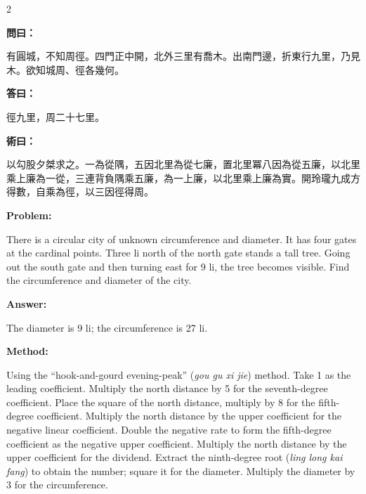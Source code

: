 \documentclass[11pt,a4paper]{article}
\newcommand{\wen}{\textbf{\color{sectioncolor}問}}
\newcommand{\da}{\textbf{\color{answercolor}答}}
\newcommand{\shu}{\textbf{\color{methodcolor}術}}
\newcommand{\prob}{\textbf{\color{sectioncolor}Problem}}
\newcommand{\ans}{\textbf{\color{answercolor}Answer}}
\newcommand{\meth}{\textbf{\color{methodcolor}Method}}
\newenvironment{zhanswer}{%
  \medskip\noindent{\color{answercolor}\rule{0.9\columnwidth}{0.4pt}}%
  \par\color{answercolor}\small
}{\par\medskip}
\newenvironment{enanswer}{%
  \medskip\noindent{\color{answercolor}\rule{0.9\columnwidth}{0.4pt}}%
  \par\color{answercolor}\small
}{\par\medskip}
\newenvironment{zhmethod}{%
  \medskip\noindent{\color{methodcolor}\rule{0.9\columnwidth}{0.4pt}}%
  \par\color{methodcolor}\small
}{\par\medskip}
\newenvironment{enmethod}{%
  \medskip\noindent{\color{methodcolor}\rule{0.9\columnwidth}{0.4pt}}%
  \par\color{methodcolor}\small
}{\par\medskip}
\begin{document}
\begin{paracol}{2}

\switchcolumn[0]
\noindent\wen\textbf{曰：}

有圓城，不知周徑。四門正中開，北外三里有喬木。出南門邊，折東行九里，乃見木。欲知城周、徑各幾何。

\begin{zhanswer}
\noindent\da\textbf{曰：}

徑九里，周二十七里。
\end{zhanswer}

\begin{zhmethod}
\noindent\shu\textbf{曰：}

以勾股夕桀求之。一為從隅，五因北里為從七廉，置北里冪八因為從五廉，以北里乘上廉為一從，三連背負隅乘五廉，為一上廉，以北里乘上廉為實。開玲瓏九成方得數，自乘為徑，以三因徑得周。
\end{zhmethod}

\switchcolumn[1]
\noindent\prob\textbf{:}

There is a circular city of unknown circumference and diameter. It has four gates at the cardinal points. Three li north of the north gate stands a tall tree. Going out the south gate and then turning east for 9 li, the tree becomes visible. Find the circumference and diameter of the city.

\begin{enanswer}
\noindent\ans\textbf{:}

The diameter is 9 li; the circumference is 27 li.
\end{enanswer}

\begin{enmethod}
\noindent\meth\textbf{:}

Using the ``hook-and-gourd evening-peak'' (\textit{gou gu xi jie}) method. Take 1 as the leading coefficient. Multiply the north distance by 5 for the seventh-degree coefficient. Place the square of the north distance, multiply by 8 for the fifth-degree coefficient. Multiply the north distance by the upper coefficient for the negative linear coefficient. Double the negative rate to form the fifth-degree coefficient as the negative upper coefficient. Multiply the north distance by the upper coefficient for the dividend. Extract the ninth-degree root (\textit{ling long kai fang}) to obtain the number; square it for the diameter. Multiply the diameter by 3 for the circumference.
\end{enmethod}

\end{paracol}
\end{document}
